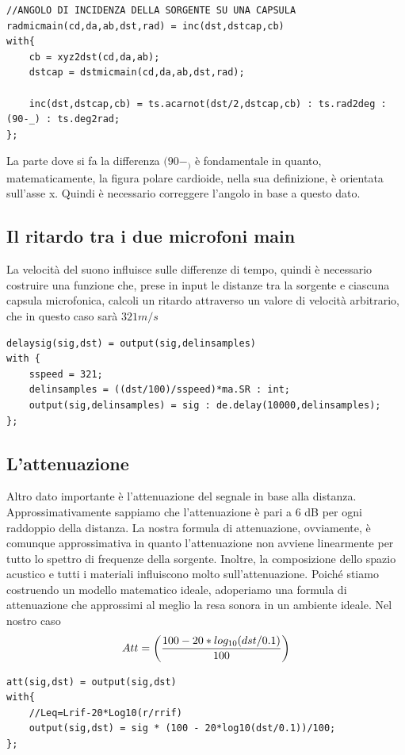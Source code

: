 \documentclass{article}
\begin{document}
    \begin{lstlisting}
//ANGOLO DI INCIDENZA DELLA SORGENTE SU UNA CAPSULA
radmicmain(cd,da,ab,dst,rad) = inc(dst,dstcap,cb)
with{
    cb = xyz2dst(cd,da,ab);
    dstcap = dstmicmain(cd,da,ab,dst,rad);
    
    inc(dst,dstcap,cb) = ts.acarnot(dst/2,dstcap,cb) : ts.rad2deg : (90-_) : ts.deg2rad;
};
    \end{lstlisting}

    La parte dove si fa la differenza $(90-_)$ è fondamentale in quanto, matematicamente, la figura polare cardioide, nella sua definizione, è orientata sull'asse x. Quindi è necessario correggere l'angolo in base a questo dato.\\
\subsection{Il ritardo tra i due microfoni main}
    La velocità del suono influisce sulle differenze di tempo, quindi è necessario costruire una funzione che, prese in input le distanze tra la sorgente e ciascuna capsula microfonica, calcoli un ritardo attraverso un valore di velocità arbitrario, che in questo caso sarà $321 m/s$

    \begin{lstlisting}
delaysig(sig,dst) = output(sig,delinsamples)
with {
    sspeed = 321;
    delinsamples = ((dst/100)/sspeed)*ma.SR : int;
    output(sig,delinsamples) = sig : de.delay(10000,delinsamples);
};
    \end{lstlisting}
    
\subsection{L'attenuazione}
    Altro dato importante è l'attenuazione del segnale in base alla distanza. Approssimativamente sappiamo che l'attenuazione è pari a 6 dB per ogni raddoppio della distanza. La nostra formula di attenuazione, ovviamente, è comunque approssimativa in quanto l'attenuazione non avviene linearmente per tutto lo spettro di frequenze della sorgente. Inoltre, la composizione dello spazio acustico e tutti i materiali influiscono molto sull'attenuazione. Poiché stiamo costruendo un modello matematico ideale, adoperiamo una formula di attenuazione che approssimi al meglio la resa sonora in un ambiente ideale. Nel nostro caso\\
    $$Att = \biggl({100 - 20*log_{10}(dst/0.1)\over100} \biggr)$$
\begin{lstlisting}
att(sig,dst) = output(sig,dst)
with{
    //Leq=Lrif-20*Log10(r/rrif)
    output(sig,dst) = sig * (100 - 20*log10(dst/0.1))/100;
};
\end{lstlisting}
\end{document}
